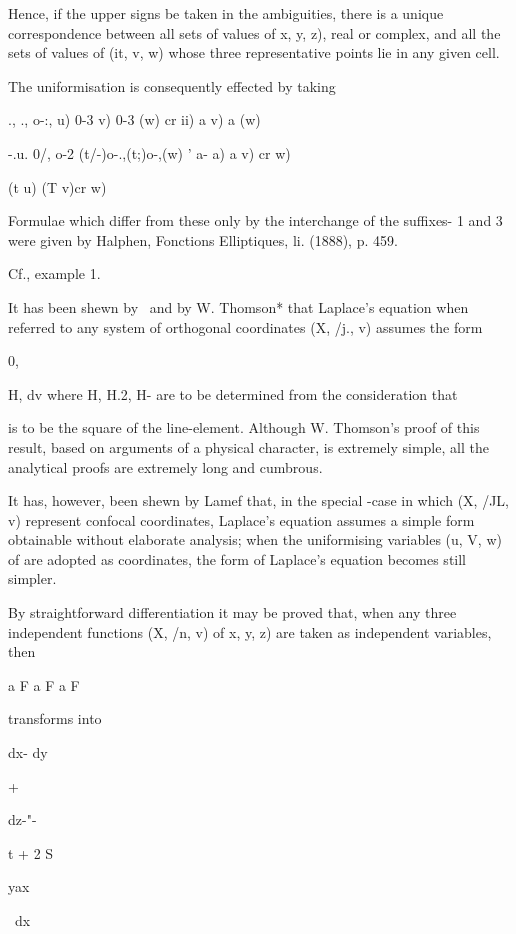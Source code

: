 {{{Hence, if the upper signs be taken in the ambiguities, there is a
unique correspondence between all sets of values of x, y, z), real or
complex, and all the sets of values of (it, v, w) whose three
representative points lie in any given cell.

The uniformisation is consequently effected by taking

., ., o-:, u) 0-3 v) 0-3 (w) cr ii) a v) a (w)

-.u. 0/, o-2 (t/-)o-.,(t;)o-,(w) ' a- a) a v) cr w)

(t u) (T v)cr w)

Formulae which differ from these only by the interchange of the
suffixes- 1 and 3 were given by Halphen, Fonctions Elliptiques, li.
(1888), p. 459.

 Cf., example 1.

%
%

It has been shewn by \Lame\ and by W. Thomson* that Laplace's equation
when referred to any system of orthogonal coordinates (X, /j., v)
assumes the form

0,

H, dv where H, H.2, H- are to be determined from the consideration
that

is to be the square of the line-element. Although W. Thomson's proof
of this result, based on arguments of a physical character, is
extremely simple, all the analytical proofs are extremely long and
cumbrous.

It has, however, been shewn by Lamef that, in the special -case in
which (X, /JL, v) represent confocal coordinates, Laplace's equation
assumes a simple form obtainable without elaborate analysis; when the
uniformising variables (u, V, w) of  are adopted as
coordinates, the form of Laplace's equation becomes still simpler.

By straightforward differentiation it may be proved that, when any
three independent functions (X, /n, v) of x, y, z) are taken as
independent variables, then

a F a F a F

transforms into

dx- dy

+

dz-"-

t + 2 S

yax

\ dx

}}}
